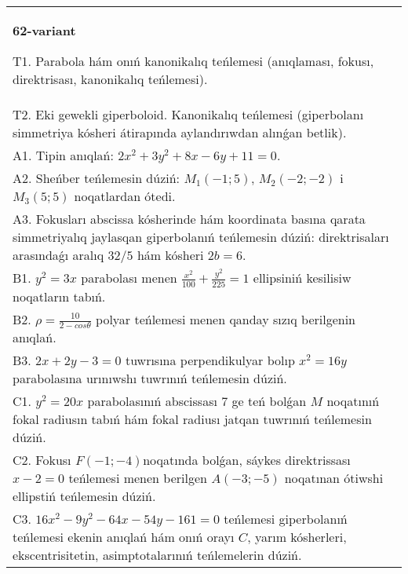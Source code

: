 \documentclass{article}
\begin{document}
\begin{tabular}{m{17cm}}
\textbf{62-variant}
\newline

T1. Parabola hám onıń kanonikalıq teńlemesi (anıqlaması, fokusı, direktrisası, kanonikalıq teńlemesi).\\

T2. Eki gewekli giperboloid. Kanonikalıq teńlemesi (giperbolanı simmetriya kósheri átirapında aylandırıwdan alınǵan betlik).\\

A1. Tipin anıqlań: $2 x^{2}+3 y^{2}+8 x-6 y+11=0$.\\

A2. Sheńber teńlemesin dúziń: $M_1 (-1;5) $, $M_2 (-2;-2) $ i $M_3 (5;5) $ noqatlardan ótedi.\\

A3. Fokusları abscissa kósherinde hám koordinata basına qarata simmetriyalıq jaylasqan giperbolanıń teńlemesin dúziń: direktrisaları arasındaǵı aralıq $32/5$ hám kósheri $2 b=6$.\\

B1. $y^{2} = 3x$ parabolası menen $\frac{x^{2}}{100} + \frac{y^{2}}{225} = 1$ ellipsiniń kesilisiw noqatların tabıń.  \\

B2. $\rho = \frac{10}{2 - cos\theta}$ polyar teńlemesi menen qanday sızıq berilgenin anıqlań.  \\

B3. $2x + 2y - 3 = 0$ tuwrısına perpendikulyar bolıp $x^{2} = 16y$ parabolasına urınıwshı tuwrınıń teńlemesin dúziń.  \\

C1. $y^{2} = 20x$ parabolasınıń abscissası 7 ge teń bolǵan $M$ noqatınıń fokal radiusın tabıń hám fokal radiusı jatqan tuwrınıń teńlemesin dúziń.  \\

C2. Fokusı $F( - 1; - 4)$noqatında bolǵan, sáykes direktrissası $x - 2 = 0$ teńlemesi menen berilgen $A( - 3; - 5)$ noqatınan ótiwshi ellipstiń teńlemesin dúziń.  \\

C3. $16x^{2} - 9y^{2} - 64x - 54y - 161 = 0$ teńlemesi giperbolanıń teńlemesi ekenin anıqlań hám onıń orayı $C$, yarım kósherleri, ekscentrisitetin, asimptotalarınıń teńlemelerin dúziń.  \\

\end{tabular}
\vspace{1cm}
\end{document}
